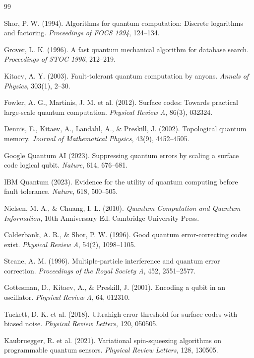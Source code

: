 ﻿\documentclass[a4paper,12pt]{article}
\theoremstyle{definition}
\begin{document}
\begin{thebibliography}{99}

Shor, P. W. (1994).
Algorithms for quantum computation: Discrete logarithms and factoring.
\textit{Proceedings of FOCS 1994}, 124--134.

Grover, L. K. (1996).
A fast quantum mechanical algorithm for database search.
\textit{Proceedings of STOC 1996}, 212--219.

Kitaev, A. Y. (2003).
Fault-tolerant quantum computation by anyons.
\textit{Annals of Physics}, 303(1), 2--30.

Fowler, A. G., Martinis, J. M. et al. (2012).
Surface codes: Towards practical large-scale quantum computation.
\textit{Physical Review A}, 86(3), 032324.

Dennis, E., Kitaev, A., Landahl, A., \& Preskill, J. (2002).
Topological quantum memory.
\textit{Journal of Mathematical Physics}, 43(9), 4452--4505.

Google Quantum AI (2023).
Suppressing quantum errors by scaling a surface code logical qubit.
\textit{Nature}, 614, 676--681.

IBM Quantum (2023).
Evidence for the utility of quantum computing before fault tolerance.
\textit{Nature}, 618, 500--505.

Nielsen, M. A., \& Chuang, I. L. (2010).
\textit{Quantum Computation and Quantum Information}, 10th Anniversary Ed.
Cambridge University Press.

Calderbank, A. R., \& Shor, P. W. (1996).
Good quantum error-correcting codes exist.
\textit{Physical Review A}, 54(2), 1098--1105.

Steane, A. M. (1996).
Multiple-particle interference and quantum error correction.
\textit{Proceedings of the Royal Society A}, 452, 2551--2577.

Gottesman, D., Kitaev, A., \& Preskill, J. (2001).
Encoding a qubit in an oscillator.
\textit{Physical Review A}, 64, 012310.

Tuckett, D. K. et al. (2018).
Ultrahigh error threshold for surface codes with biased noise.
\textit{Physical Review Letters}, 120, 050505.

Kaubruegger, R. et al. (2021).
Variational spin-squeezing algorithms on programmable quantum sensors.
\textit{Physical Review Letters}, 128, 130505.


\end{thebibliography}
\end{document}
